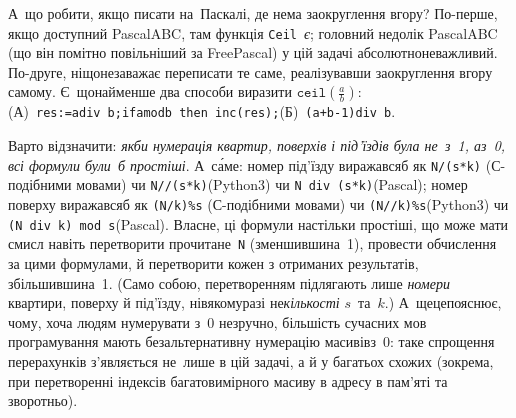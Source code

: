 А~що робити, якщо писати на~Паскалі, де нема заокруглення вгору? По-перше, якщо доступний PascalABC, там функція \texttt{Ceil}~\emph{є}; головний недолік PascalABC (що він помітно повільніший за Free\nolinebreak[3] Pascal) у цій задачі абсолютно\nolinebreak[2] не\nolinebreak[3] важливий. По-друге, ніщо\nolinebreak[2] не\nolinebreak[3] заважає переписати те саме, реалізувавши заокруглення вгору самому. Є~щонайменше два способи виразити $\texttt{ceil}(\frac{a}{b})$:\linebreak[2] (А)~\texttt{res:=\nolinebreak[2]a\nolinebreak[3] div~b;\linebreak[2] if\nolinebreak[3] a\nolinebreak[3] mod\nolinebreak[3] b\nolinebreak[2] {<}{>} then inc(res);}\linebreak[2] (Б)~\texttt{\mbox{(a+b-1)}\nolinebreak[3] div~b}.

\label{text:about-good-formulae-for-0-based-numbering}%
Варто %
відзначити: %
\emph{якби нумерація квартир, поверхів і під'їздів була не~з~1, а\nolinebreak[2] з~0, всі формули були~б %
простіші}. А~с\'{а}ме: 
номер під'їзду виражався\nolinebreak[3] б як 
\verb"N/(s*k)" (С-подібними мовами) чи 
\verb"N//(s*k)"\nolinebreak[2] (Python3) чи 
\verb"N div (s*k)"\nolinebreak[3] (Pascal);
номер поверху виражався\nolinebreak[3] б як 
\verb"(N/k)%s" (С-подібними мовами) чи 
\verb"(N//k)%s"\nolinebreak[2] (Python3) чи 
\verb"(N div k) mod s"\nolinebreak[3] (Pascal).
Власне, ці формули настільки простіші, що може мати смисл навіть перетворити прочитане~\texttt{N} (зменшивши\nolinebreak[2] на~1), провести обчислення за цими формулами, й перетворити кожен з отриманих результатів, збільшивши\nolinebreak[2] на~1.
(Само собою, перетворенням підлягають лише \emph{номери} квартири, поверху й під'їзду, ні\nolinebreak[2] в\nolinebreak[2] якому\nolinebreak[2] разі не\nolinebreak[3] \emph{кількості} $s$~та~$k$.)
А~ще\nolinebreak[2] це\nolinebreak[3] пояснює, чому, хоча людям нумерувати з~0 незручно, більшість сучасних мов програмування мають безальтернативну нумерацію масивів\nolinebreak[2] з~0: таке спрощення перерахунків з'являється не~лише в цій задачі, а й у багатьох %
схожих (зокрема, при перетворенні індексів багатовимірного масиву в адресу в пам'яті та зворотньо).
